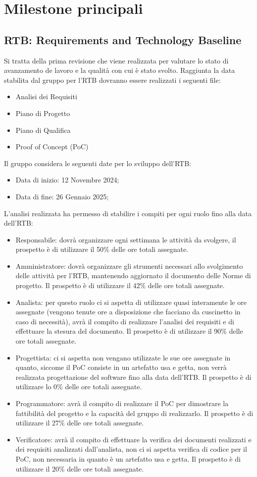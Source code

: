 \section{Milestone principali}
\label{sec:milestone_principali}
\subsection{RTB: Requirements and Technology Baseline}
Si tratta della prima revisione che viene realizzata per valutare lo stato di avanzamento de lavoro e la qualità con cui è stato svolto.
Raggiunta la data stabilita dal gruppo per l'RTB dovranno essere realizzati i seguenti file:

\begin{itemize}
\item Analisi dei Requisiti
\item Piano di Progetto
\item Piano di Qualifica
\item Proof of Concept (PoC)
\end{itemize}
Il gruppo considera le seguenti date per lo sviluppo dell'RTB:
\begin{itemize}
    \item Data di inizio: 12 Novembre 2024;
    \item Data di fine: 26 Gennaio 2025;
\end{itemize}
L'analisi realizzata ha permesso di stabilire i compiti per ogni ruolo fino alla data dell'RTB:
\begin{itemize}
\item Responsabile: dovrà organizzare ogni settimana le attività da svolgere, il prospetto è di utilizzare il 50\% delle ore totali assegnate.
\item Amministratore: dovrà organizzare gli strumenti necessari allo svolgimento delle attività per l'RTB, mantenendo aggiornato il documento delle Norme di progetto.
Il prospetto è di utilizzare il 42\% delle ore totali assegnate.
\item Analista: per questo ruolo ci si aspetta di utilizzare quasi interamente le ore assegnate (vengono tenute ore a disposizione che facciano da cuscinetto in caso di necessità), avrà il compito di realizzare l'analisi dei requisiti e di effettuare la stesura del documento.
Il prospetto è di utilizzare il 90\% delle ore totali assegnate.
\item Progettista: ci si aspetta non vengano utilizzate le sue ore assegnate in quanto, siccome il PoC consiste in un artefatto usa e getta, non verrà realizzata progettazione del software fino alla data dell'RTB.
Il prospetto è di utilizzare lo 0\% delle ore totali assegnate.
\item Programmatore: avrà il compito di realizzare il PoC per dimostrare la fattibilità del progetto e la capacità del gruppo di realizzarlo.
Il prospetto è di utilizzare il 27\% delle ore totali assegnate.
\item Verificatore: avrà il compito di effettuare la verifica dei documenti realizzati e dei requisiti analizzati dall'analista, non ci si aspetta verifica di codice per il PoC, non necessaria in quanto è un artefatto usa e getta.
Il prospetto è di utilizzare il 20\% delle ore totali assegnate.
\end{itemize}
